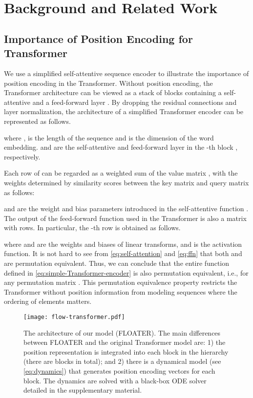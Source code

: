 \documentclass[11pt]{article}
\begin{document}
\section{Background and Related Work}
\label{sec:background}
\subsection{Importance of Position Encoding for Transformer}
\label{sec:importance}
We use a simplified self-attentive sequence encoder to illustrate the
importance of position encoding in the Transformer. Without position
encoding, the Transformer architecture can be viewed as a stack of 
blocks  containing a self-attentive  and a
feed-forward layer . By dropping the residual connections and layer
normalization, the architecture of a simplified Transformer encoder can be
represented as follows.

where ,  is the
length of the sequence and  is the dimension of the word embedding.
 and  are the self-attentive and feed-forward layer in the -th block , respectively.

Each row of  can be regarded as a weighted sum of the value matrix , with the weights determined by similarity
scores between the key matrix  and query matrix  as follows:

 and  are the weight and bias parameters introduced in the self-attentive function . 
The output of the feed-forward function  used in the Transformer is also a matrix with  rows. In particular, the -th row is obtained as follows.

where  and  are the weights and biases of linear transforms, and  is the activation function. It is not hard to see from \eqref{eq:self-attention} and \eqref{eq:ffn} that both  and  are permutation equivalent. Thus, we can conclude that the entire function defined in \eqref{eq:simple-Transformer-encoder} is also permutation equivalent, i.e.,  for any  permutation matrix . 
This permutation equivalence property restricts the Transformer without position information from modeling sequences where the ordering of elements matters. 

\begin{figure*}[htb]
    \centering
    \texttt{[image: flow-transformer.pdf]}
    \caption{The architecture of our model (FLOATER). The main differences between FLOATER and the original Transformer model are: 1) the position representation is integrated into each block in the hierarchy (there are  blocks in total); and 2) there is a dynamical model (see \eqref{eq:dynamics}) that generates position encoding vectors for each block. The dynamics are solved with a black-box ODE solver detailed in the supplementary material. }
    \label{fig:arch-flow-Transformer}
\end{figure*}
\end{document}
